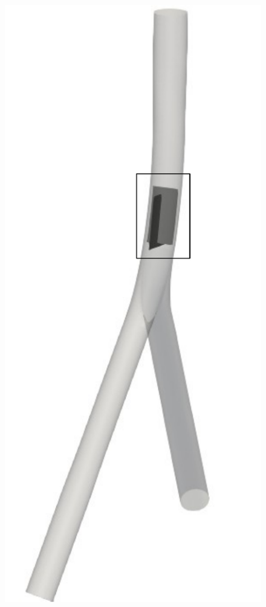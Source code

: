 \begin{figure}[htbp]
    \centering
    \begin{minipage}[c][8cm][c]{0.15\textwidth}
    \includegraphics[scale=0.28]{imgs/vena_cava/venacava_piv1.pdf}

\end{minipage}
\end{figure}
